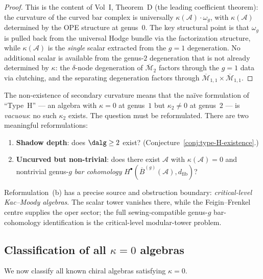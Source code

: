 \documentclass[11pt]{article}
\newcommand{\cA}{\mathcal{A}}
\newcommand{\cM}{\mathcal{M}}
\newcommand{\barB}{\overline{B}}
\newcommand{\dfib}{d_{\mathrm{fib}}}
\begin{document}
\begin{proof}
This is the content of Vol~I, Theorem~D (the leading coefficient
theorem): the curvature of the curved bar complex is universally
$\kappa(\cA) \cdot \omega_g$, with $\kappa(\cA)$ determined by the
OPE structure at genus~$0$.  The key structural point is that
$\omega_g$ is pulled back from the universal Hodge bundle via the
factorization structure, while $\kappa(\cA)$ is the \emph{single}
scalar extracted from the $g = 1$ degeneration.  No additional
scalar is available from the genus-$2$ degeneration that is not
already determined by $\kappa$: the $\delta$-node degeneration
of $\overline{\cM}_2$ factors through the $g = 1$ data via
clutching, and the separating degeneration factors through
$\overline{\cM}_{1,1} \times \overline{\cM}_{1,1}$.
\end{proof}

\begin{remark}
\label{rem:type-H-curvature-distinction}
The non-existence of secondary curvature means that the na\"ive
formulation of ``Type~H'' --- an algebra with $\kappa = 0$ at
genus~$1$ but $\kappa_2 \neq 0$ at genus~$2$ --- is
\emph{vacuous}: no such $\kappa_2$ exists.  The question must be
reformulated.  There are two meaningful reformulations:
\begin{enumerate}[label=\textup{(\alph*)}]
\item \textbf{Shadow depth}: does $\dalg \geq 2$ exist?
  (Conjecture~\ref{conj:type-H-existence}.)
\item \textbf{Uncurved but non-trivial}: does there exist
  $\cA$ with $\kappa(\cA) = 0$ and nontrivial genus-$g$
  \emph{bar cohomology} $H^\bullet(\barB^{(g)}(\cA), \dfib)$?
\end{enumerate}
Reformulation~(b) has a precise source and obstruction boundary:
\emph{critical-level Kac--Moody algebras}.  The scalar tower
vanishes there, while the Feigin--Frenkel centre supplies the
oper sector; the full sewing-compatible genus-$g$ bar-cohomology
identification is the critical-level modular-tower problem.
\end{remark}

\subsection{Classification of all $\kappa = 0$ algebras}

We now classify all known chiral algebras satisfying $\kappa = 0$.
\end{document}
